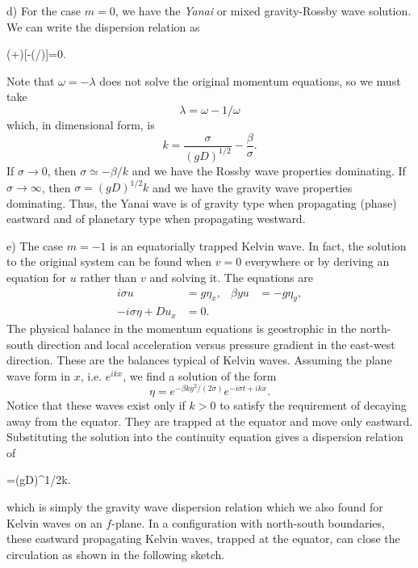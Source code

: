 \noindent d) For the case $m=0$, we have the \emph{Yanai} or mixed gravity-Rossby wave
solution. We can write the dispersion relation as
\begin{waveequation}
	(\lambda+\omega)[\lambda-(/\omega)]=0.
\end{waveequation}


Note that $\omega=-\lambda$ does not solve the original momentum equations, so we
must take
\[
	\lambda=\omega-1/\omega
\]
which, in dimensional form, is
\[
	k=\frac{\sigma}{(gD)^{1/2}}-\frac{\beta}{\sigma}.
\]
If $\sigma\to0$, then $\sigma\simeq-\beta/k$ and we have the Rossby wave properties
dominating. If $\sigma\to\infty$, then $\sigma=(gD)^{1/2}k$ and we have the gravity
wave properties dominating. Thus, the Yanai wave is of gravity type when propagating
(phase) eastward and of planetary type when propagating westward.

\noindent e) The case $m=-1$ is an equatorially trapped Kelvin wave. In fact, the
solution to the original system can be found when $v=0$ everywhere or by deriving an
equation for $u$ rather than $v$ and solving it. The equations are
\begin{align*}
	i\sigma u         & =g\eta_x,
	                  & \beta yu  & =-g\eta_y, \\
	-i\sigma\eta+Du_x & =0.
\end{align*}
The physical balance in the momentum equations is geostrophic in the north-south
direction and local acceleration versus pressure gradient in the east-west direction.
These are the balances typical of Kelvin waves. Assuming the plane wave form in $x$,
i.e. $e^{ikx}$, we find a solution of the form
\[
	\eta=e^{-\beta k y^2/(2\sigma)}e^{-i\sigma t+ikx}.
\]
Notice that these waves exist only if $k>0$ to satisfy the requirement of decaying away
from the equator. They are trapped at the equator and move only eastward. Substituting
the solution into the continuity equation gives a dispersion relation of
\begin{waveequation}
	\sigma=(gD)^{1/2}k.
\end{waveequation}

\sourcepagebreak

which is simply the gravity wave dispersion relation which we also found for Kelvin
waves on an $f$-plane. In a configuration with north-south boundaries, these eastward
propagating Kelvin waves, trapped at the equator, can close the circulation as shown in
the following sketch.

